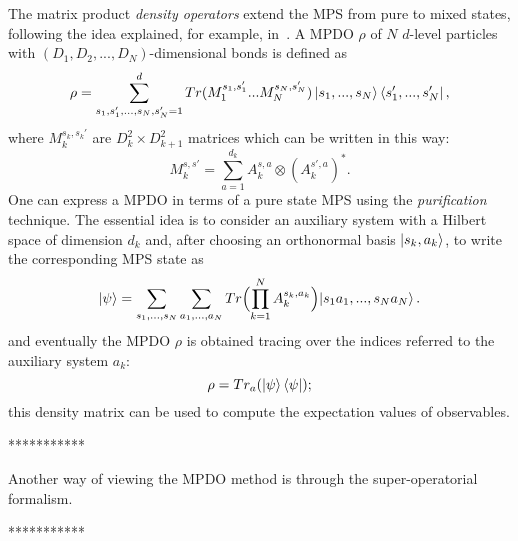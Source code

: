 The matrix product \emph{density operators} extend the MPS from pure to mixed states, following the idea explained, for example, in~\cite{PhysRevLett.93.207204}. A MPDO $\rho$ of $N$ $d$-level particles with $(D_1, D_2, ..., D_N)$-dimensional bonds is defined as
\begin{equation}
    \rho = \sum_{s_1,s_1', ... ,s_N,s_N' = 1}^{d} Tr(M_1^{s_1,s_1'} ... M_N^{s_N,s_N'}) \ket{s_1, ... ,s_N}\bra{s'_1, ... ,s'_N},
\end{equation}
where $M_k^{s_k,s_k'}$ are $D_k^2 \times D_{k+1}^2$ matrices which can be written in this way:
\begin{equation}
    M_k^{s,s'} = \sum_{a = 1}^{d_k} A_k^{s,a} \otimes (A_k^{s',a})^*.
\end{equation}
One can express a MPDO in terms of a pure state MPS using the \emph{purification}~\cite{nielsen_chuang} technique. The essential idea is to consider an auxiliary system with a Hilbert space of dimension $d_k$ and, after choosing an orthonormal basis $\ket{s_k, a_k}$, to write the corresponding MPS state as
\begin{equation}
    \ket{\psi} = \sum_{s_1,...,s_N} \sum_{a_1, ..., a_N} Tr\Bigl(\prod_{k=1}^N A_k^{s_k, a_k}\Bigl) \ket{s_1a_1, ..., s_Na_N}.
\end{equation}
and eventually the MPDO $\rho$ is obtained tracing over the indices referred to the auxiliary system $a_k$:
\begin{equation}
    \rho = Tr_a(\ket{\psi}\bra{\psi});
\end{equation}
this density matrix can be used to compute the expectation values of observables.

***********

Another way of viewing the MPDO method is through the super-operatorial formalism.~\cite{PhysRevLett.93.207205}


***********